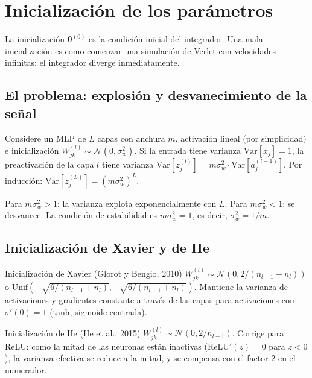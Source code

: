 \section{Inicialización de los parámetros}
\label{sec:init}


La inicialización $\bm{\theta}^{(0)}$ es la condición inicial del
integrador. Una mala inicialización es como comenzar una simulación
de Verlet con velocidades infinitas: el integrador diverge
inmediatamente.

\subsection{El problema: explosión y desvanecimiento de la señal}
\label{subsec:init_problema}

Considere un MLP de $L$ capas con anchura $m$, activación lineal (por
simplicidad) e inicialización $W_{jk}^{(l)} \sim \mathcal{N}(0,\sigma_w^2)$.
Si la entrada tiene varianza $\text{Var}[x_j] = 1$, la preactivación de
la capa $l$ tiene varianza $\text{Var}[z_j^{(l)}] = m\sigma_w^2 \cdot
\text{Var}[a_j^{(l-1)}]$. Por inducción:
$\text{Var}[z_j^{(L)}] = (m\sigma_w^2)^L$.

Para $m\sigma_w^2 > 1$: la varianza explota exponencialmente con $L$.
Para $m\sigma_w^2 < 1$: se desvanece. La condición de estabilidad es
$m\sigma_w^2 = 1$, es decir, $\sigma_w^2 = 1/m$.

\subsection{Inicialización de Xavier y de He}
\label{subsec:xavier_he}

\begin{definicion}{Inicialización de Xavier (Glorot y Bengio, 2010)}
\label{def:xavier}
$W_{jk}^{(l)} \sim \mathcal{N}(0, 2/(n_{l-1}+n_l))$ o
$\text{Unif}(-\sqrt{6/(n_{l-1}+n_l)}, +\sqrt{6/(n_{l-1}+n_l)})$.
Mantiene la varianza de activaciones y gradientes constante a través de
las capas para activaciones con $\sigma'(0) = 1$ (tanh, sigmoide
centrada).
\end{definicion}

\begin{definicion}{Inicialización de He (He et al., 2015)}
\label{def:he}
$W_{jk}^{(l)} \sim \mathcal{N}(0, 2/n_{l-1})$.
Corrige para ReLU: como la mitad de las neuronas están inactivas
($\text{ReLU}'(z) = 0$ para $z < 0$), la varianza efectiva se reduce
a la mitad, y se compensa con el factor $2$ en el numerador.
\end{definicion}

